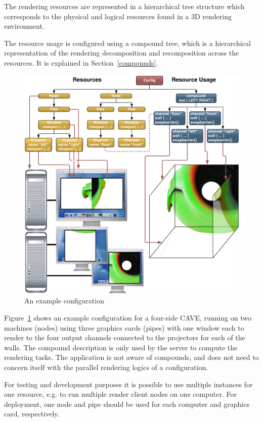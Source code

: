 \documentclass[10pt,a4]{scrartcl}
\newcommand{\fig}[1]{Figure~\ref{#1}}
\newcommand{\sref}[1]{Section~\ref{#1}}
\begin{document}
The rendering resources are represented in a hierarchical tree structure
which corresponds to the physical and logical resources found in a 3D
rendering environment. 

The resource usage is configured using a compound tree, which is a
hierarchical representation of the rendering decomposition and
recomposition across the resources. It is explained in \sref{compounds}.

\begin{figure}[ht!]\center
  \includegraphics[width=\textwidth]{images/cave.pdf}
  {\caption{\small\label{fConfig}An example configuration}}
\end{figure}

\fig{fConfig} shows an example configuration for a four-side
CAVE, running on two machines (nodes) using three graphics
cards (pipes) with one window each to render to the four output channels
connected to the projectors for each of the walls. The compound
description is only used by the server to compute the rendering
tasks. The application is not aware of compounds, and does not need to
concern itself with the parallel rendering logics of a configuration.

For testing and development purposes it is possible to use multiple
instances for one resource, e.g. to run multiple render client nodes on
one computer. For deployment, one node and pipe should be used for each
computer and graphics card, respectively.
\end{document}
